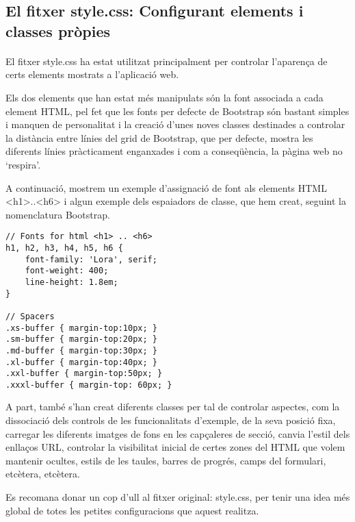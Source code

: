 \subsection{El fitxer style.css: Configurant elements i classes pròpies}

    \paragraph{}
    El fitxer style.css ha estat utilitzat principalment per controlar l'aparença de certs elements mostrats a l'aplicació web.

    Els dos elements que han estat més manipulats són la font associada a cada element HTML, pel fet que les fonts per defecte de Bootstrap són bastant simples i manquen de personalitat i la creació d'unes noves classes destinades a controlar la distància entre línies del grid de Bootstrap, que per defecte, mostra les diferents línies pràcticament enganxades i com a conseqüència, la pàgina web no `respira'.

    A continuació, mostrem un exemple d'assignació de font als elements HTML <h1>..<h6> i algun exemple dels espaiadors de classe, que hem creat, seguint la nomenclatura Bootstrap.

    \begin{lstlisting}[style=rawOwn,caption={Assignant fonts a elements HTML i creació d'espaiadors}]
// Fonts for html <h1> .. <h6>
h1, h2, h3, h4, h5, h6 {
    font-family: 'Lora', serif;
    font-weight: 400;
    line-height: 1.8em;
}

// Spacers
.xs-buffer { margin-top:10px; }
.sm-buffer { margin-top:20px; }
.md-buffer { margin-top:30px; }
.xl-buffer { margin-top:40px; }
.xxl-buffer { margin-top:50px; }
.xxxl-buffer { margin-top: 60px; }
    \end{lstlisting}

    A part, també s'han creat diferents classes per tal de controlar aspectes, com la dissociació dels controls de les funcionalitats d'exemple, de la seva posició fixa, carregar les diferents imatges de fons en les capçaleres de secció, canvia l'estil dels enllaços URL, controlar la visibilitat inicial de certes zones del HTML que volem mantenir ocultes, estils de les taules, barres de progrés, camps del formulari, etcètera, etcètera.

    Es recomana donar un cop d'ull al fitxer original: style.css, per tenir una idea més global de totes les petites configuracions que aquest realitza.
